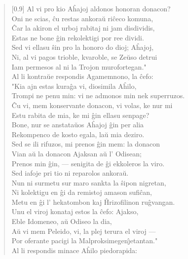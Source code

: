 \begin{verse}[0.9\textwidth]
          Al vi pro kio A\^hajoj aldonos honoran donacon?\\
          Oni ne scias, \^cu restas ankora\u u ri\^ceco komuna,\\
          \^Car la akiron el urboj rabitaj ni jam disdividis,\\
          Estas ne bone \^gin rekolektigi por ree dividi.\\
          Sed vi ellasu \^sin pro la honoro do dioj; A\^hajoj,\\
          Ni, al vi pagos trioble, kvaroble, se Ze\u uso detrui\\
          Iam permesos al ni la Trojon murofortegan."\\
           \vin  Al li kontra\u ue respondis Agamemnono, la \^cefo:\\
          "Kia ajn estas kura\^ga vi, diosimila A\^hilo,\\
          Trompi ne penu min: vi ne admonos min nek superruzos.\\
          \^Cu vi, mem konservante donacon, vi volas, ke nur mi\\
          Estu rabita de mia, ke mi \^gin ellasu senpage?\\
          Bone, nur se anstata\u uos A\^hajoj \^gin per alia\\
          Rekompenco de kosto egala, la\u u mia deziro.\\
          Sed se ili rifuzos, mi prenos \^gin mem: la donacon\\
          Vian a\u u la donacon Ajaksan a\u u l' Odisean;\\
          Prenos min \^gin, --- senigita de \^gi ekkoleros la viro.\\
          Sed iafoje pri tio ni reparolos ankora\u u.\\
          Nun ni surmetu sur maro sankta la \^sipon nigretan,\\
          Ni kolektigu en \^gi da remistoj amason sufi\^can,\\
          Metu en \^gi l' hekatombon kaj \^Hrizofilinon ru\^gvangan.\\
          Unu el viroj konataj estos la \^cefo: Ajakso,\\
          Eble Idomeneo, a\u u Odiseo la dia,\\
          A\u u vi mem Peleido, vi, la plej terura el viroj ---\\
          Por oferante pacigi la Malproksimegen\^{\j}etantan."\\
           \vin  Al li respondis minace A\^hilo piedorapida:\\

\end{verse}

